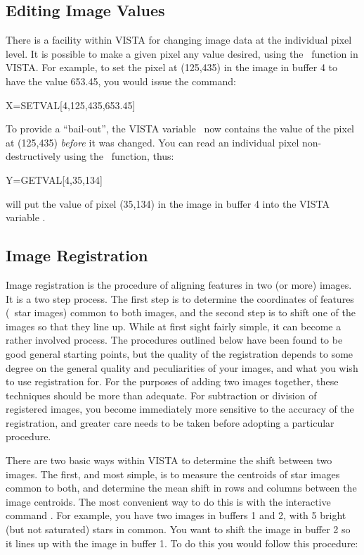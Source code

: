 \subsection{Editing Image Values}
\label{sec:imchangepix}
There is a facility within VISTA for changing image data at the individual
pixel level.  It is possible to make a given pixel any value desired,
using the \ function in VISTA.  For example, to set the pixel at
(125,435) in the image in buffer 4 to have the value 653.45, you would issue
the command: 
\begin{command}
      \item X=SETVAL[4,125,435,653.45]
\end{command}
To provide a ``bail-out'', the VISTA variable \ now contains the value
of the pixel at (125,435) {\it before} it was changed.  You can read an
individual pixel non-destructively using the \ function, thus:
\begin{command}
      \item Y=GETVAL[4,35,134]
\end{command}
will put the value of pixel (35,134) in the image in buffer 4 into the
VISTA variable .

\subsection{Image Registration}
\label{sec:imregister}
Image registration is the procedure of aligning features in two (or more)
images.  It is a two step process.  The first step is to determine the
coordinates of features (\eg\ star images) common to both images, and the
second step is to shift one of the images so that they line up.  While at
first sight fairly simple, it can become a rather involved process.  The
procedures outlined below have been found to be good general starting points,
but the quality of the registration depends to some degree on the general
quality and peculiarities of your images, and what you wish to use
registration for.  For the purposes of adding two images together, these
techniques should be more than adequate.  For subtraction or division of
registered images, you become immediately more sensitive to the accuracy of
the registration, and greater care needs to be taken before adopting a
particular procedure. 

There are two basic ways within VISTA to determine the shift between two
images.  The first, and most simple, is to measure the centroids of star
images common to both, and determine the mean shift in rows and columns
between the image centroids.  The most convenient way to do this is with the
interactive command .  For example, you have two images in
buffers 1 and 2, with 5 bright (but not saturated) stars in common.  You want
to shift the image in buffer 2 so it lines up with the image in buffer 1.  To
do this you would follow this procedure: 

